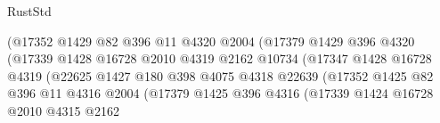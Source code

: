 \begin{lexlean}{RustStd}
\begin{coremodule}
                                          (@17352
                                            @1429
                                            @82
                                            @396
                                            @11
                                            @4320
                                            @2004
                                            (@17379
                                              @1429
                                              @396
                                              @4320
                                              (@17339
                                                @1428
                                                @16728
                                                @2010
                                                @4319
                                                @2162
                                                @10734
                                                (@17347
                                                  @1428
                                                  @16728
                                                  @4319
                                                  (@22625
                                                    @1427
                                                    @180
                                                    @398
                                                    @4075
                                                    @4318
                                                    @22639
                                                    (@17352
                                                      @1425
                                                      @82
                                                      @396
                                                      @11
                                                      @4316
                                                      @2004
                                                      (@17379
                                                        @1425
                                                        @396
                                                        @4316
                                                        (@17339
                                                          @1424
                                                          @16728
                                                          @2010
                                                          @4315
                                                          @2162

\end{coremodule}
\end{lexlean}
